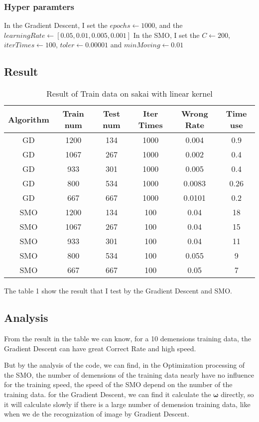 \documentclass[conference,compsoc]{IEEEtran}
\begin{document}
	\subsubsection{Hyper paramters}
		In the Gradient Descent, I set the $epochs\gets 1000$, and the $learningRate\gets [0.05,0.01,0.005,0.001]$
		In the SMO, I set the $C\gets 200$, $iterTimes\gets 100$, $toler\gets 0.00001$ and $minMoving \gets 0.01$
  \subsection{Result}
	\begin{table}[h]
		\centering
		\caption{Result of Train data on sakai with linear kernel}\label{tab:aStrangeTable}
		\begin{tabular}{|c|c|c|c|c|c|}
		\hline
		\textbf{Algorithm} & \textbf{Train num} & \textbf{Test num} & \textbf{Iter Times} & \textbf{Wrong Rate} & \textbf{Time use}\\
		\hline
		GD	& 1200	& 134	& 1000	& 0.004	& 0.9\\ 
		\hline
		GD	& 1067	& 267	& 1000	& 0.002& 0.4\\
		\hline
		GD	& 933	& 301	& 1000	& 0.005 & 0.4\\
		\hline
		GD 	& 800	& 534	& 1000	& 0.0083& 0.26\\
		\hline
		GD	& 667	& 667	& 1000	& 0.0101& 0.2\\
		\hline
		SMO	& 1200	& 134	& 100	& 0.04	& 18\\ 
		\hline
		SMO	& 1067	& 267	& 100	& 0.04	& 15\\
		\hline
		SMO	& 933	& 301	& 100	& 0.04 & 11\\
		\hline
		SMO	& 800	& 534	& 100	& 0.055	& 9\\
		\hline
		SMO	& 667	& 667	& 100	& 0.05 & 7\\
		\hline
		\end{tabular}
	\end{table}
	The table 1 show the result that I test by the Gradient Descent and SMO.
  \subsection{Analysis}
	From the result in the table we can know, for a 10 demensions training data, the Gradient Descent can have great Correct Rate and high speed.
	
	But by the analysis of the code, we can find, in the Optimization processing of the SMO, the number of demensions of the training data nearly have no influence for the training speed, the speed of the SMO depend on the number of the training data.
	for the  Gradient Descent, we can find it calculate the $\bm{\omega}$ directly, so it will calculate slowly if there is a large number of demension training data, like when we de the recognization of image by Gradient Descent.


\end{document}

